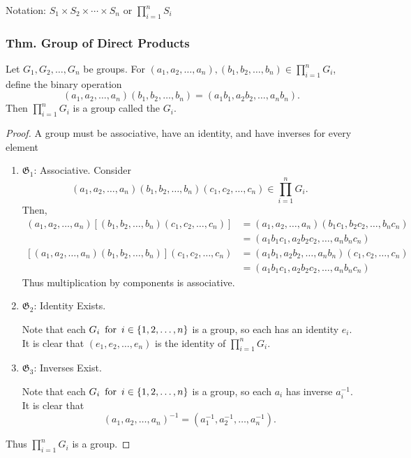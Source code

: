 Notation: $S_1 \times S_2 \times \cdots \times S_n$ or $\prod^n_{i=1} S_i$

\subsubsection{Thm. Group of Direct Products}
Let $G_1,G_2,\ldots,G_n$ be groups. For $(a_1,a_2,\ldots,a_n),(b_1,b_2,\ldots,b_n) \in \prod_{i=1}^{n} G_i$, define the binary operation 
\[
    (a_1,a_2,\ldots,a_n)(b_1,b_2,\ldots,b_n) = (a_1b_1,a_2b_2,\ldots,a_nb_n).
\]
Then $\prod_{i=1}^{n} G_i$ is a group called the  $G_i$.
\begin{proof}
    A group must be associative, have an identity, and have inverses for every element
    \begin{enumerate}
        \item $\mathfrak{G}_1$: Associative. Consider
        \[
            (a_1,a_2,\ldots,a_n)(b_1,b_2,\ldots,b_n)(c_1,c_2,\ldots,c_n) \in \prod_{i=1}^{n} G_i.
        \]
        Then,
        \begin{align*}
            (a_1,a_2,\ldots,a_n)[(b_1,b_2,\ldots,b_n)(c_1,c_2,\ldots,c_n)] & = (a_1,a_2,\ldots,a_n)(b_1c_1,b_2c_2,\ldots,b_nc_n) \\
            & = (a_1b_1c_1,a_2b_2c_2,\ldots,a_nb_nc_n) \\
            [(a_1,a_2,\ldots,a_n)(b_1,b_2,\ldots,b_n)](c_1,c_2,\ldots,c_n) & = (a_1b_1,a_2b_2,\ldots,a_nb_n)(c_1,c_2,\ldots,c_n) \\
            & = (a_1b_1c_1,a_2b_2c_2,\ldots,a_nb_nc_n)
        \end{align*}
        Thus multiplication by components is associative.
        \item $\mathfrak{G}_2$: Identity Exists.

        Note that each $G_i \operatorname{~\text{for}~} i \in \{1,2,\ldots,n\}$ is a group, so each has an identity $e_i$. It is clear that $(e_1,e_2,\ldots,e_n)$ is the identity of $\prod_{i=1}^{n} G_i$.
        \item $\mathfrak{G}_3$: Inverses Exist.
        
        Note that each $G_i \operatorname{~\text{for}~} i \in \{1,2,\ldots,n\}$ is a group, so each $a_i$ has inverse $a_i^{-1}$. It is clear that
        \[
            (a_1,a_2,\ldots,a_n)^{-1} = (a_1^{-1},a_2^{-1},\ldots,a_n^{-1}).
        \]
    \end{enumerate}
    Thus $\prod_{i=1}^{n} G_i$ is a group.
\end{proof}